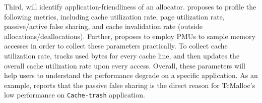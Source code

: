 Third, \MP{} will identify application-friendliness of an allocator. \MP{} proposes to profile the following metrics, including cache utilization rate, page utilization rate, passive/active false sharing, and cache invalidation rate (outside allocations/deallocations). Further, \MP{} proposes to employ PMUs to sample memory accesses in order to collect these parameters practically. To collect cache utilization rate, \MP{} tracks used bytes for every cache line, and then updates the overall cache utilization rate upon every access. Overall, these parameters will help users to understand the performance degrade on a specific application. As an example, \MP{} reports that the passive false sharing is the direct reason for TcMalloc's low performance on \texttt{Cache-trash} application.








